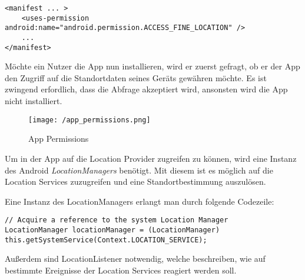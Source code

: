 \begin{lstlisting}[caption={App Permissions},label=lst:locationPermission]
<manifest ... >
    <uses-permission android:name="android.permission.ACCESS_FINE_LOCATION" />
    ...
</manifest>
\end{lstlisting}

Möchte ein Nutzer die App nun installieren, wird er zuerst gefragt, ob er der App den Zugriff auf die Standortdaten seines Geräts gewähren möchte. Es ist zwingend erfordlich, dass die Abfrage akzeptiert wird, ansonsten wird die App nicht installiert.

\begin{figure}[H]
	\centering
	\texttt{[image: /app\_permissions.png]}
	\caption[Lokalisierung: App Permissions]{App Permissions}
	\label{fig:appPermissions}
\end{figure}

Um in der App auf die Location Provider zugreifen zu können, wird eine Instanz des Android \textit{LocationManagers} benötigt. Mit diesem ist es möglich auf die Location Services zuzugreifen und eine Standortbestimmung auszulösen.

Eine Instanz des LocationManagers erlangt man durch folgende Codezeile:

\begin{lstlisting}[caption={LocationManager Instanz},label=lst:locationManagerInstance, basicstyle=\footnotesize]
// Acquire a reference to the system Location Manager
LocationManager locationManager = (LocationManager) this.getSystemService(Context.LOCATION_SERVICE);
\end{lstlisting}

Außerdem sind LocationListener notwendig, welche beschreiben, wie auf bestimmte Ereignisse der Location Services reagiert werden soll.

